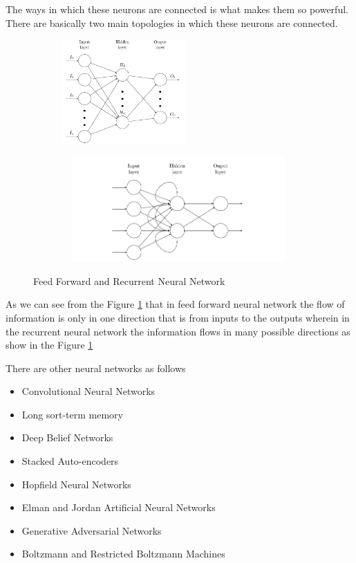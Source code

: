 \documentclass[12pt, a4paper]{report}
\begin{document}
The ways in which these neurons are connected is what makes them so powerful. There are basically two main topologies in which these neurons are connected. 
\begin{figure}[h]
\centering
  \begin{subfigure}[b]{0.4\textwidth}
    \includegraphics[width=\textwidth,height=4cm]{nn_2.png}
    
  \end{subfigure}
  \begin{subfigure}[b]{0.4\textwidth}
    \includegraphics[width=9cm,height=4cm]{rnn.png}
  \end{subfigure}
  \caption{Feed Forward and Recurrent Neural Network}
 \label{fig:FFRN}
\end{figure}

As we can see from the Figure \ref{fig:FFRN} that in feed forward neural network the flow of information is only in one direction that is from inputs to the outputs wherein in the recurrent neural network the information flows in many possible directions as show in the Figure \ref{fig:FFRN} \\ \par

There are other neural networks as follows
\begin{itemize}
	\item Convolutional Neural Networks
	\item Long sort-term memory
	\item Deep Belief Networks
	\item Stacked Auto-encoders
	\item Hopfield Neural Networks 
	\item Elman and Jordan Artificial Neural Networks
	\item Generative Adversarial Networks
	\item Boltzmann and Restricted Boltzmann Machines
\end{itemize}
\end{document}

